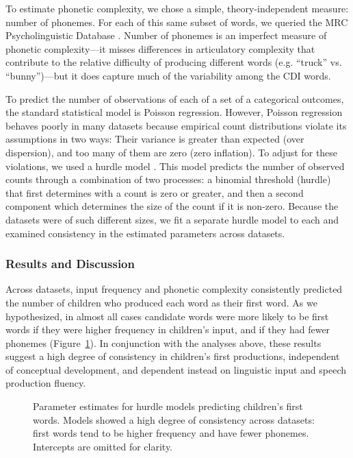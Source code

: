 \documentclass[10pt,letterpaper]{article}
\begin{document}
To estimate phonetic complexity, we chose a simple, theory-independent measure: number of phonemes. For each of this same subset of words, we queried the MRC Psycholinguistic Database \cite{Wilson1988}. Number of phonemes is an imperfect measure of phonetic complexity---it misses differences in articulatory complexity that contribute to the relative difficulty of producing different words (e.g. ``truck'' vs. ``bunny'')---but it does capture much of the variability among the CDI words.

To predict the number of observations of each of a set of a categorical outcomes, the standard statistical model is Poisson regression. However, Poisson regression behaves poorly in many datasets because empirical count distributions violate its assumptions in two ways: Their variance is greater than expected (over dispersion), and too many of them are zero (zero inflation). To adjust for these violations, we used a hurdle model \cite{mullahy1986}. This model predicts the number of observed counts through a combination of two processes: a binomial threshold (hurdle) that first determines with a count is zero or greater, and then a second component which determines the size of the count if it is non-zero. Because the datasets were of such different sizes, we fit a separate hurdle model to each and examined consistency in the estimated parameters across datasets.

\subsubsection{Results and Discussion}

Across datasets, input frequency and phonetic complexity consistently predicted the number of children who produced each word as their first word. As we hypothesized, in almost all cases candidate words were more likely to be first words if they were higher frequency in children's input, and if they had fewer phonemes (Figure~\ref{fig:hurdles}). In conjunction with the analyses above, these results suggest a high degree of consistency in children's first productions, independent of conceptual development, and dependent instead on linguistic input and speech production fluency.

\begin{figure}[tb]
\caption{\label{fig:hurdles} Parameter estimates for hurdle models predicting children's first words. Models showed a high degree of consistency across datasets: first words tend to be higher frequency and have fewer phonemes. Intercepts are omitted for clarity.}
\end{figure}
\end{document}
